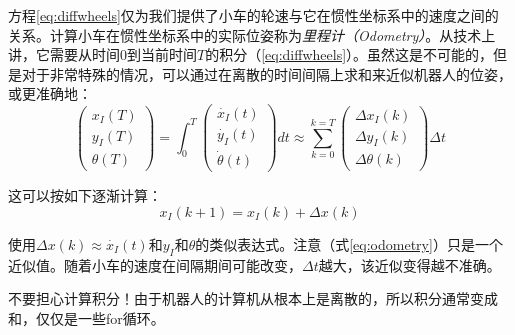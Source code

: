 方程\ref{eq:diffwheels}仅为我们提供了小车的轮速与它在惯性坐标系中的速度之间的关系。计算小车在惯性坐标系中的实际位姿称为\emph{里程计（Odometry）}。从技术上讲，它需要从时间$0$到当前时间$T$的积分（\ref{eq:diffwheels}）。虽然这是不可能的，但是对于非常特殊的情况，可以通过在离散的时间间隔上求和来近似机器人的位姿，或更准确地：
\begin{equation}
\left(\begin{array}{c} {x_I}(T)\\{y_I}(T)\\{\theta}(T)\end{array}\right)=
\int_0^T \left(\begin{array}{c} \dot{x_I}(t)\\\dot{y_I}(t)\\\dot{\theta}(t)\end{array}\right) dt \approx
\sum_{k=0}^{k=T}\left(\begin{array}{c} \Delta{x_I}(k)\\\Delta{y_I}(k)\\\Delta{\theta}(k)\end{array}\right)\Delta t
\end{equation}

这可以按如下逐渐计算：
\begin{equation}\label{eq:odometry}
x_I(k+1)=x_I(k)+\Delta x (k)
\end{equation}


使用$\Delta x(k)\approx\dot{x_I}(t)$和$y_I$和$\theta$的类似表达式。注意（式\ref{eq:odometry}）只是一个近似值。随着小车的速度在间隔期间可能改变，$\Delta t$越大，该近似变得越不准确。

\begin{framed}

不要担心计算积分！由于机器人的计算机从根本上是离散的，所以积分通常变成和，仅仅是一些for循环。
\end{framed}


